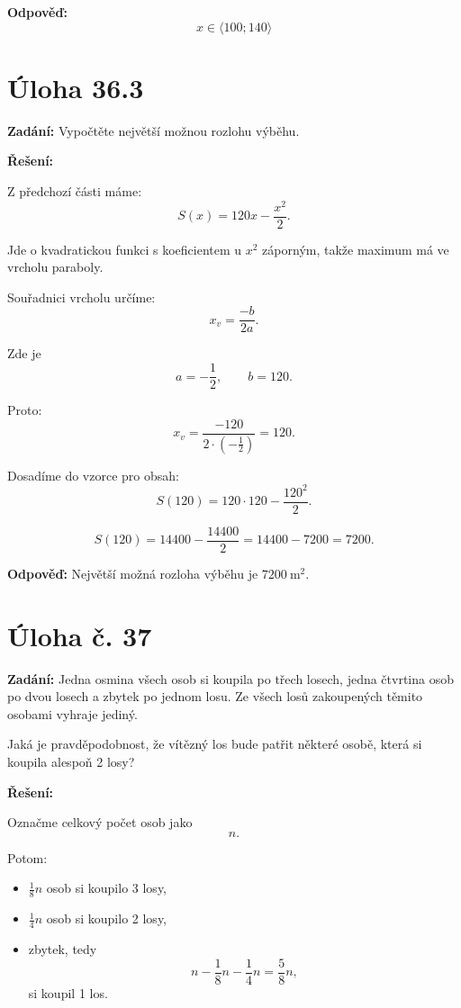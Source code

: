 \documentclass[12pt,a4paper]{article}
\begin{document}
\bigskip

\textbf{Odpověď:}  
\[
x\in\langle 100;140\rangle
\]


\section*{Úloha 36.3}

\textbf{Zadání:}  
Vypočtěte největší možnou rozlohu výběhu.

\bigskip

\textbf{Řešení:}

Z předchozí části máme:
\[
S(x)=120x-\frac{x^2}{2}.
\]

Jde o kvadratickou funkci s koeficientem u \(x^2\) záporným, takže maximum má ve vrcholu paraboly.

Souřadnici vrcholu určíme:
\[
x_v=\frac{-b}{2a}.
\]

Zde je
\[
a=-\frac12,\qquad b=120.
\]

Proto:
\[
x_v=\frac{-120}{2\cdot\left(-\frac12\right)}=120.
\]

Dosadíme do vzorce pro obsah:
\[
S(120)=120\cdot 120-\frac{120^2}{2}.
\]

\[
S(120)=14400-\frac{14400}{2}=14400-7200=7200.
\]

\bigskip

\textbf{Odpověď:}  
Největší možná rozloha výběhu je \(7200\ \mathrm{m}^2\).



\newpage
\section*{Úloha č. 37}

\textbf{Zadání:}  
Jedna osmina všech osob si koupila po třech losech, jedna čtvrtina osob po dvou losech a zbytek po jednom losu. Ze všech losů zakoupených těmito osobami vyhraje jediný.

Jaká je pravděpodobnost, že vítězný los bude patřit některé osobě, která si koupila alespoň 2 losy?

\bigskip

\textbf{Řešení:}

Označme celkový počet osob jako
\[
n.
\]

Potom:
\begin{itemize}
    \item \(\frac18 n\) osob si koupilo 3 losy,
    \item \(\frac14 n\) osob si koupilo 2 losy,
    \item zbytek, tedy
    \[
    n-\frac18 n-\frac14 n = \frac58 n,
    \]
    si koupil 1 los.
\end{itemize}
\end{document}

